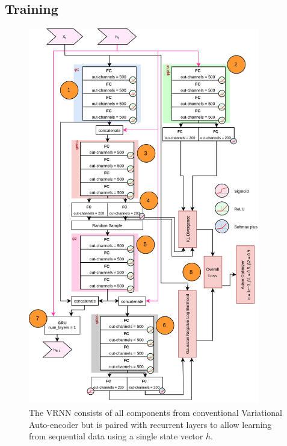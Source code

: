 \documentclass[12pt]{article}
\begin{document}
\subsection{Training}


\begin{figure}
\includegraphics[width=0.9\textwidth]{img/vrnn-arch.png}
\caption{The VRNN consists of all components from conventional Variational Auto-encoder but is paired with recurrent layers to allow learning from sequential data using a single state vector $h$.}
\label{fig:vrnn-arch}
\end{figure}
\end{document}
